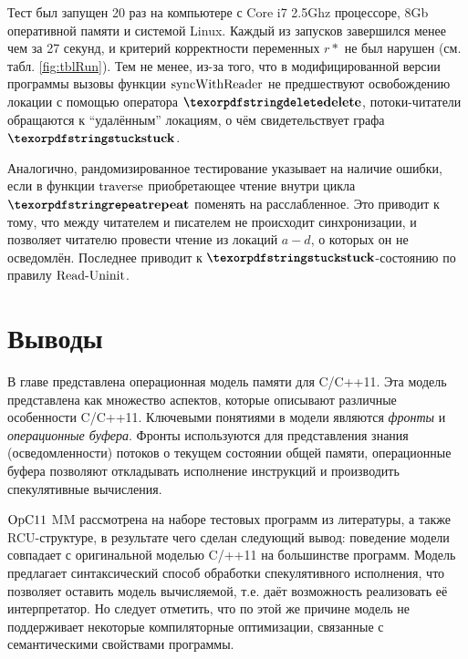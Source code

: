 Тест был запущен 20 раз на компьютере с Core i7 2.5Ghz процессоре, 8Gb оперативной памяти и системой Linux.
Каждый из запусков завершился менее чем за 27 секунд, и критерий корректности переменных $r*$ не был нарушен
(см. табл. \ref{fig:tblRun}). Тем не менее, из-за того, что в модифицированной версии программы
вызовы функции ${\rm syncWithReader}$ не предшествуют освобождению
локации с помощью оператора $\kw{delete}$, потоки-читатели
обращаются к ``удалённым'' локациям, о чём свидетельствует графа $\kw{stuck}$.

Аналогично, рандомизированное тестирование указывает на наличие ошибки, если в функции ${\rm traverse}$
приобретающее чтение внутри цикла $\kw{repeat}$ поменять на расслабленное. Это приводит к тому, что между
читателем и писателем не происходит синхронизации, и позволяет читателю провести чтение из локаций $a-d$,
о которых он не осведомлён. Последнее приводит к $\kw{stuck}$-состоянию по правилу ${\rm Read\text{-}Uninit}$.

\section{Выводы}
\label{sec:opc11:results}
В главе представлена операционная модель памяти для C/C++11.
Эта модель представлена как множество аспектов, которые описывают различные особенности
C/C++11.
Ключевыми понятиями в модели являются \emph{фронты} и \emph{операционные буфера}.
Фронты используются для представления знания (осведомленности) потоков
о текущем состоянии общей памяти,
операционные буфера позволяют откладывать исполнение инструкций и
производить спекулятивные вычисления.

$\mathrm{OpC11}$ MM рассмотрена на наборе тестовых программ из литературы, а также RCU-структуре,
в результате чего сделан следующий вывод:
поведение модели совпадает с оригинальной моделью C/++11 на большинстве программ.
Модель предлагает синтаксический способ обработки спекулятивного исполнения, что
позволяет оставить модель вычисляемой, т.е. даёт возможность реализовать её интерпретатор.
Но следует отметить, что по этой же причине модель не поддерживает некоторые компиляторные оптимизации,
связанные с семантическими свойствами программы.
